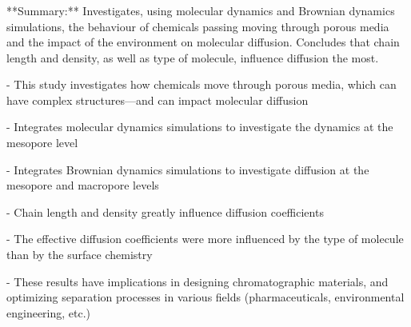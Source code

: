 \documentclass[11pt]{article}
\begin{document}
\clearpage

\subsubsection{\texorpdfstring{\cite{tallarek_probing_2023}}{}}

\begin{markdown}

**Summary:** Investigates, using molecular dynamics and Brownian dynamics simulations, the behaviour of chemicals passing moving through porous media and the impact of the environment on molecular diffusion. Concludes that chain length and density, as well as type of molecule, influence diffusion the most.

- This study investigates how chemicals move through porous media, which can have complex structures—and can impact molecular diffusion
    
- Integrates molecular dynamics simulations to investigate the dynamics at the mesopore level
    
- Integrates Brownian dynamics simulations to investigate diffusion at the mesopore and macropore levels
    
- Chain length and density greatly influence diffusion coefficients
    
- The effective diffusion coefficients were more influenced by the type of molecule than by the surface chemistry
    
- These results have implications in designing chromatographic materials, and optimizing separation processes in various fields (pharmaceuticals, environmental engineering, etc.)

\end{markdown}

\clearpage

\subsubsection{\texorpdfstring{\cite{walker_life_2024}}{}}
\end{document}

